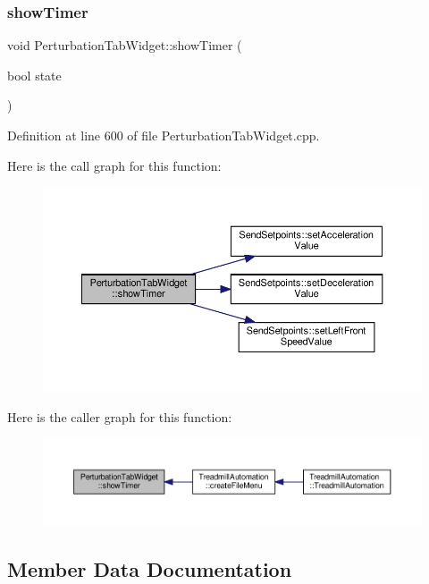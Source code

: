 \subsubsection{\texorpdfstring{show\+Timer}{showTimer}}
{\footnotesize\ttfamily void Perturbation\+Tab\+Widget\+::show\+Timer (\begin{DoxyParamCaption}\item[{bool}]{state }\end{DoxyParamCaption})\hspace{0.3cm}{\ttfamily [slot]}}



Definition at line 600 of file Perturbation\+Tab\+Widget.\+cpp.

Here is the call graph for this function\+:
\nopagebreak
\begin{figure}[H]
\begin{center}
\leavevmode
\includegraphics[width=350pt]{class_perturbation_tab_widget_a2b0878675fa56a11049173a0a8230cfe_cgraph}
\end{center}
\end{figure}
Here is the caller graph for this function\+:
\nopagebreak
\begin{figure}[H]
\begin{center}
\leavevmode
\includegraphics[width=350pt]{class_perturbation_tab_widget_a2b0878675fa56a11049173a0a8230cfe_icgraph}
\end{center}
\end{figure}


\subsection{Member Data Documentation}
\mbox{\label{class_perturbation_tab_widget_ae2cc24f378f8f95e47c80325e026a9d0}} 

